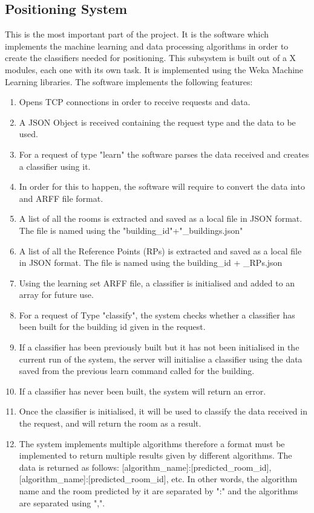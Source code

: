 \subsection{Positioning System}
This is the most important part of the project. It is the software which implements the machine learning and data processing algorithms in order to create the classifiers needed for positioning.
This subsystem is built out of a X modules, each one with its own task. It is implemented using the Weka Machine Learning libraries. The software implements the following features:
\begin{enumerate}
\item Opens TCP connections in order to receive requests and data.
\item A JSON Object is received containing the request type and the data to be used.
\item For a request of type "learn" the software parses the data received and creates a classifier using it.
\item In order for this to happen, the software will require to convert the data into and ARFF file format.
\item A list of all the rooms is extracted and saved as a local file in JSON format. The file is named using the "building\_id"+"\_buildings.json"
\item A list of all the Reference Points (RPs) is extracted and saved as a local file in JSON format. The file is named using the building\_id + \_RPs.json
\item Using the learning set ARFF file, a classifier is initialised and added to an array for future use.
\item For a request of Type "classify", the system checks whether a classifier has been built for the building id given in the request.
\item If a classifier has been previously built but it has not been initialised in the current run of the system, the server will initialise a classifier using the data saved from the previous learn command called for the building.
\item If a classifier has never been built, the system will return an error.
\item Once the classifier is initialised, it will be used to classify the data received in the request, and will return the room as a result.
\item The system implements multiple algorithms therefore a format must be implemented to return multiple results given by different algorithms. The data is returned as follows: [algorithm\_name]:[predicted\_room\_id],[algorithm\_name]:[predicted\_room\_id], etc. In other words, the algorithm name and the room predicted by it are separated by ":" and the algorithms are separated using ",".

\end{enumerate}
